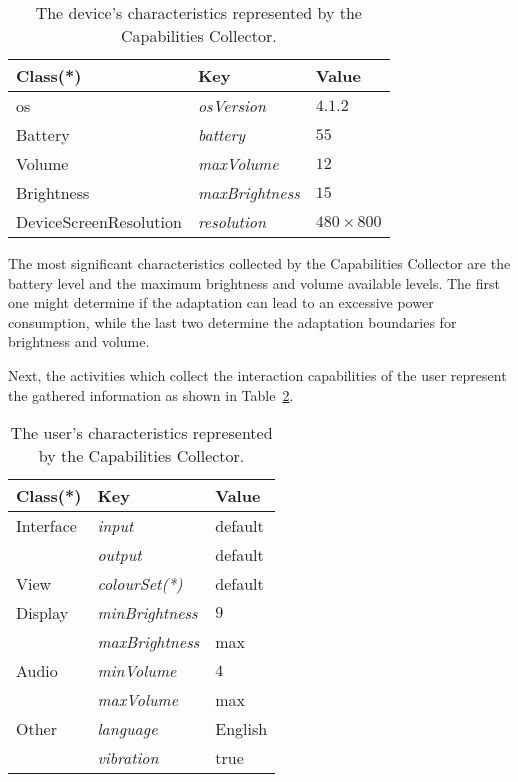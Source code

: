 \begin{table}
 \caption{The device's characteristics represented by the Capabilities Collector.}
 \label{tbl:device}
 \footnotesize
 \centering
\begin{tabular}{l l l}
  \hline 
  \textbf{Class(*)}& \textbf{Key} & \textbf{Value}		\\
  \hline
  \ac{os}	& \textit{osVersion}		& $4.1.2$	\\
  Battery	& \textit{battery}		& $55$		\\
  Volume	& \textit{maxVolume}		& $12$		\\
  Brightness	& \textit{maxBrightness}	& $15$		\\
  DeviceScreenResolution & \textit{resolution}	& $480×800$	\\	
  \hline
\end{tabular}
\end{table}

The most significant characteristics collected by the Capabilities Collector
are the battery level and the maximum brightness and volume available levels.
The first one might determine if the adaptation can lead to an excessive power
consumption, while the last two determine the adaptation boundaries for brightness
and volume.

Next, the activities which collect the interaction capabilities of the user
represent the gathered information as shown in Table~\ref{tbl:user}.

\begin{table}
 \caption{The user's characteristics represented by the Capabilities Collector.}
 \label{tbl:user}
 \footnotesize
 \centering
\begin{tabular}{l l l}
  \hline 
  \textbf{Class(*)}& \textbf{Key} & \textbf{Value}		\\
  \hline
  Interface 	& \textit{input}		& default	\\
		& \textit{output} 		& default	\\
  View		& \textit{colourSet(*)}		& default	\\
  Display 	& \textit{minBrightness}	& $9$		\\ 
 		& \textit{maxBrightness}	& max		\\
  Audio 	& \textit{minVolume}		& $4$		\\
 		& \textit{maxVolume} 		& max		\\
  Other 	& \textit{language}		& English	\\
 		& \textit{vibration} 		& true 		\\	
  \hline
\end{tabular}
\end{table}

